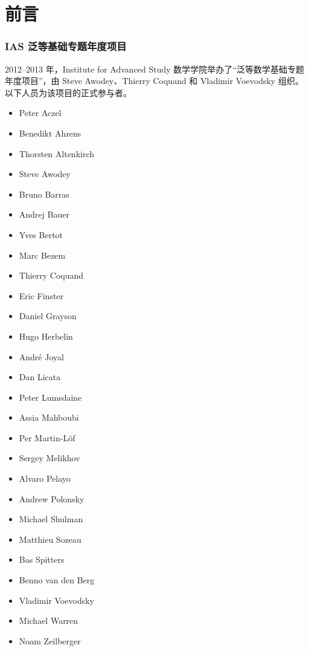 \chapter*{前言}
\label{cha:preface}

\subsection*{IAS 泛等基础专题年度项目}

2012--2013 年，Institute for Advanced Study 数学学院举办了“泛等数学基础专题年度项目”，由 Steve Awodey、Thierry Coquand 和 Vladimir Voevodsky 组织。以下人员为该项目的正式参与者。

\begin{multicols}{\OPTprefacecols}{
\begin{itemize}
\item[] Peter Aczel
\item[] Benedikt Ahrens
\item[] Thorsten Altenkirch
\item[] Steve Awodey
\item[] Bruno Barras
\item[] Andrej Bauer
\item[] Yves Bertot
\item[] Marc Bezem
\item[] Thierry Coquand
\item[] Eric Finster
\item[] Daniel Grayson
\item[] Hugo Herbelin
\item[] Andr\'e Joyal
\item[] Dan Licata
\item[] Peter Lumsdaine
\item[] Assia Mahboubi
\item[] Per Martin-L\"of
\item[] Sergey Melikhov
\item[] Alvaro Pelayo
\item[] Andrew Polonsky
\item[] Michael Shulman
\item[] Matthieu Sozeau
\item[] Bas Spitters
\item[] Benno van den Berg
\item[] Vladimir Voevodsky
\item[] Michael Warren
\item[] Noam Zeilberger
\end{itemize}
}
\end{multicols}

